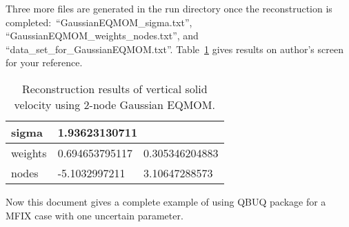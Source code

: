 \documentclass[a4paper,12pt,titlepage]{article}
\begin{document}
Three more files are generated in the run directory once the reconstruction is
completed:\ ``GaussianEQMOM\_sigma.txt'', \\``GaussianEQMOM\_weights\_nodes.txt'', 
and \\``data\_set\_for\_GaussianEQMOM.txt''. Table~\ref{tab:ReconVs} gives results 
on author's screen for your reference.

\begin{table}[htp]
 \centering
 \begin{tabular}{l|ll} \hline
  sigma   & \multicolumn{2}{l}{1.93623130711} \\ \hline
  weights & 0.694653795117 & 0.305346204883   \\ \hline
  nodes   & -5.1032997211  & 3.10647288573    \\ \hline
 \end{tabular}
 \caption{Reconstruction results of vertical solid velocity using $2$-node 
 Gaussian EQMOM.}
 \label{tab:ReconVs}
\end{table}

Now this document gives a complete example of using QBUQ package for a MFIX case
with one uncertain parameter.





\end{document}
